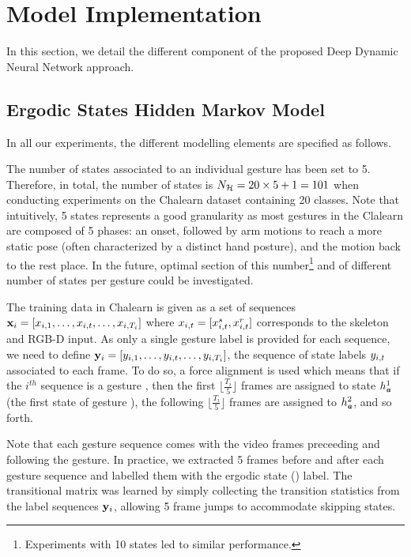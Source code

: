 

\section{Model Implementation}
\label{sec:ModelImplementation}

In this section, we detail the different component of the proposed Deep Dynamic Neural Network approach.

\subsection{Ergodic States Hidden Markov Model}

In all our experiments, the different modelling elements are specified as follows.

The number of states \nsig{} associated to an individual gesture has been set to 5.
Therefore, in total, the number of states is $N_{\mathcal{H}} = 20 \times 5 + 1 = 101$
when conducting  experiments on the Chalearn dataset containing 20 classes.
%
Note that intuitively, 5 states represents a good granularity as
most gestures in the Clalearn are composed of 5 phases: an onset, followed by arm motions to reach a more static pose
(often characterized by a distinct hand posture), and the motion back to the rest place.
%
In the future, optimal section of this number\footnote{Experiments with 10 states led to similar performance.}
and of different number of states per gesture could be investigated.
%


The training data in Chalearn is given as a set of sequences
$\mathbf x_i=[x_{i,1}, \ldots,x_{i,t},\ldots, x_{i,T_i}]$
where $x_{i,t}=[x_{i,t}^s, x_{i,t}^r]$ corresponds to the skeleton and RGB-D input.
%
As only a single gesture label is provided for each sequence, we need to define
$\mathbf y_i=[y_{i,1}, \ldots,y_{i,t},\ldots, y_{i,T_i}]$,
the sequence of state labels $y_{i,t}$ associated to each frame.
%
To do so, a force alignment is used which means that if the $i^{th}$ sequence is a gesture \gesturea{}, then the first $\lfloor \frac{T_i}{5} \rfloor$ frames are assigned to state $h_{\textbf{\emph{a}}}^1$ (the first state of gesture \gesturea{}),
the following $\lfloor \frac{T_i}{5} \rfloor$ frames are assigned to $h_{\textbf{\emph{a}}}^2$, and so forth.

Note that each gesture sequence comes with the video frames preceeding and following the gesture.
In practice, we extracted 5 frames before and after each gesture sequence and labelled them
with the ergodic state (\ergodicstate) label.
%
The transitional matrix \transitionmatrix{} was learned by simply  collecting the transition statistics from the label sequences $\mathbf y_i$, allowing 5 frame jumps to accommodate skipping states.

